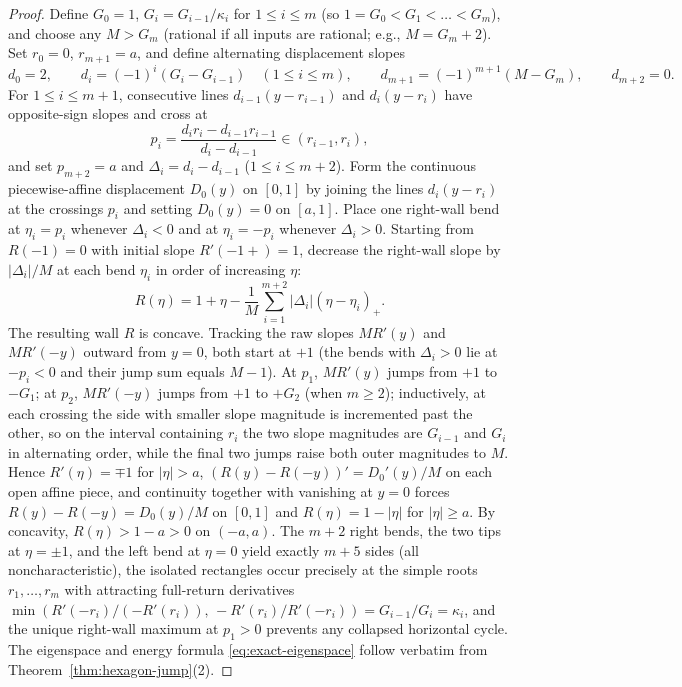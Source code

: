 \documentclass[11pt,reqno]{amsart}
\theoremstyle{definition}
\theoremstyle{remark}
\begin{document}
\begin{proof}
Define $G_0 = 1$, $G_i = G_{i-1}/\kappa_i$ for $1 \le i \le m$ (so $1 = G_0 < G_1 < \dots < G_m$), and choose any $M > G_m$ (rational if all inputs are rational; e.g., $M = G_m + 2$). Set $r_0 = 0$, $r_{m+1} = a$, and define alternating displacement slopes
\[
  d_0 = 2, \qquad d_i = (-1)^i (G_i - G_{i-1}) \quad (1 \le i \le m), \qquad d_{m+1} = (-1)^{m+1} (M - G_m), \qquad d_{m+2} = 0.
\]
For $1 \le i \le m+1$, consecutive lines $d_{i-1}(y - r_{i-1})$ and $d_i(y - r_i)$ have opposite-sign slopes and cross at
\[
  p_i = \frac{d_i r_i - d_{i-1} r_{i-1}}{d_i - d_{i-1}} \in (r_{i-1}, r_i),
\]
and set $p_{m+2} = a$ and $\Delta_i = d_i - d_{i-1}$ ($1 \le i \le m+2$). Form the continuous piecewise-affine displacement $D_0(y)$ on $[0,1]$ by joining the lines $d_i(y-r_i)$ at the crossings $p_i$ and setting $D_0(y) = 0$ on $[a,1]$. Place one right-wall bend at $\eta_i = p_i$ whenever $\Delta_i < 0$ and at $\eta_i = -p_i$ whenever $\Delta_i > 0$. Starting from $R(-1) = 0$ with initial slope $R'(-1+) = 1$, decrease the right-wall slope by $|\Delta_i|/M$ at each bend $\eta_i$ in order of increasing $\eta$:
\[
  R(\eta) = 1 + \eta - \frac{1}{M}\sum_{i=1}^{m+2} |\Delta_i|(\eta - \eta_i)_+.
\]
The resulting wall $R$ is concave. Tracking the raw slopes $M R'(y)$ and $M R'(-y)$ outward from $y = 0$, both start at $+1$ (the bends with $\Delta_i > 0$ lie at $-p_i < 0$ and their jump sum equals $M-1$). At $p_1$, $M R'(y)$ jumps from $+1$ to $-G_1$; at $p_2$, $M R'(-y)$ jumps from $+1$ to $+G_2$ (when $m \ge 2$); inductively, at each crossing the side with smaller slope magnitude is incremented past the other, so on the interval containing $r_i$ the two slope magnitudes are $G_{i-1}$ and $G_i$ in alternating order, while the final two jumps raise both outer magnitudes to $M$. Hence $R'(\eta) = \mp 1$ for $|\eta| > a$, $(R(y)-R(-y))' = D_0'(y)/M$ on each open affine piece, and continuity together with vanishing at $y = 0$ forces $R(y) - R(-y) = D_0(y)/M$ on $[0,1]$ and $R(\eta) = 1 - |\eta|$ for $|\eta| \ge a$. By concavity, $R(\eta) > 1 - a > 0$ on $(-a, a)$. The $m+2$ right bends, the two tips at $\eta = \pm 1$, and the left bend at $\eta = 0$ yield exactly $m+5$ sides (all noncharacteristic), the isolated rectangles occur precisely at the simple roots $r_1, \dots, r_m$ with attracting full-return derivatives $\min(R'(-r_i)/(-R'(r_i)),\, -R'(r_i)/R'(-r_i)) = G_{i-1}/G_i = \kappa_i$, and the unique right-wall maximum at $p_1 > 0$ prevents any collapsed horizontal cycle. The eigenspace and energy formula \eqref{eq:exact-eigenspace} follow verbatim from Theorem~\ref{thm:hexagon-jump}(2).


\end{proof}
\end{document}
